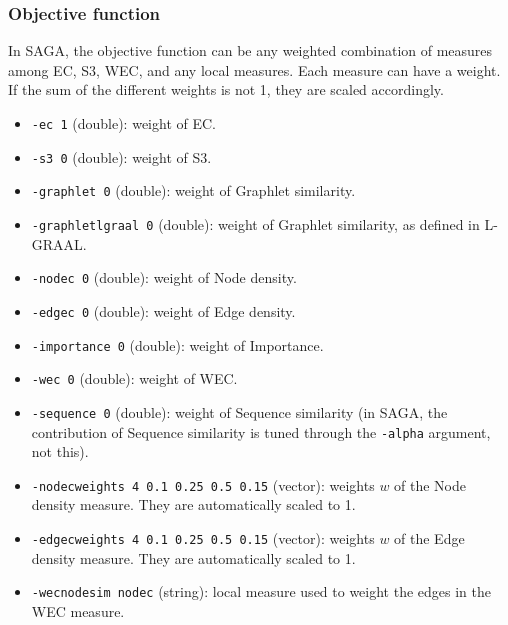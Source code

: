 \documentclass[]{article}
\begin{document}
\subsubsection*{Objective function}
In SAGA, the objective function can be any weighted combination of measures among EC, S3, WEC, and any local measures. Each measure can have a weight. If the sum of the different weights is not 1, they are scaled accordingly.

\begin{itemize}
\item\texttt{-ec 1} (double): weight of EC.
\item\texttt{-s3 0} (double): weight of S3.
\item\texttt{-graphlet 0} (double): weight of Graphlet similarity.
\item\texttt{-graphletlgraal 0} (double): weight of Graphlet similarity, as defined in L-GRAAL.
\item\texttt{-nodec 0} (double): weight of Node density.
\item\texttt{-edgec 0} (double): weight of Edge density.
\item\texttt{-importance 0} (double): weight of Importance.
\item\texttt{-wec 0} (double): weight of WEC.
\item\texttt{-sequence 0} (double): weight of Sequence similarity (in SAGA, the contribution of Sequence similarity is tuned through the \texttt{-alpha} argument, not this).
\item\texttt{-nodecweights 4 0.1 0.25 0.5 0.15} (vector): weights $w$ of the Node density measure. They are automatically scaled to 1.
\item\texttt{-edgecweights 4 0.1 0.25 0.5 0.15} (vector): weights $w$ of the Edge density measure. They are automatically scaled to 1.
\item\texttt{-wecnodesim nodec} (string): local measure used to weight the edges in the WEC measure.
\end{itemize}
\end{document}

